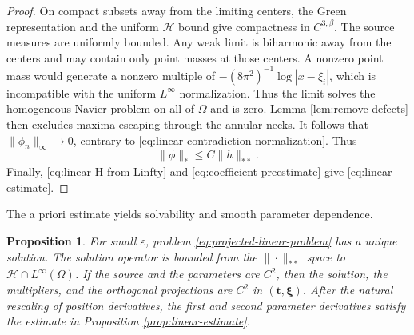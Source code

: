 \documentclass[11pt]{article}
\newtheorem{proposition}[theorem]{Proposition}
\numberwithin{equation}{section}
\begin{document}
\begin{proof}
On compact subsets away from the limiting centers, the Green
representation and the uniform $\mathcal H$ bound give compactness in
$C^{3,\beta}$. The source measures are uniformly bounded. Any weak
limit is biharmonic away from the centers and may contain only point
masses at those centers. A nonzero point mass would generate a
nonzero multiple of $-(8\pi^2)^{-1}\log|x-\xi_i|$, which is
incompatible with the uniform $L^\infty$ normalization. Thus the
limit solves the homogeneous Navier problem on all of $\Omega$ and is
zero. Lemma \ref{lem:remove-defects} then excludes maxima escaping
through the annular necks. It follows that
$\|\phi_n\|_\infty\to0$, contrary to
\eqref{eq:linear-contradiction-normalization}. Thus
\begin{equation*}
\|\phi\|_*\leq C\|h\|_{**}.
\end{equation*}
Finally, \eqref{eq:linear-H-from-Linfty} and
\eqref{eq:coefficient-preestimate} give
\eqref{eq:linear-estimate}.
\end{proof}

The a priori estimate yields solvability and smooth parameter dependence.

\begin{proposition}\label{prop:linear-solvability}
For small $\varepsilon$, problem \eqref{eq:projected-linear-problem} has a unique solution. The solution operator is bounded from the $\|\cdot\|_{**}$ space to
$\mathcal H\cap L^\infty(\Omega)$. If the source and the parameters are $C^2$, then the solution, the multipliers, and the orthogonal projections are $C^2$ in
$(\boldsymbol t,\boldsymbol\xi)$. After the natural rescaling of position derivatives, the first and second parameter derivatives satisfy the estimate in Proposition \ref{prop:linear-estimate}.
\end{proposition}
\end{document}
